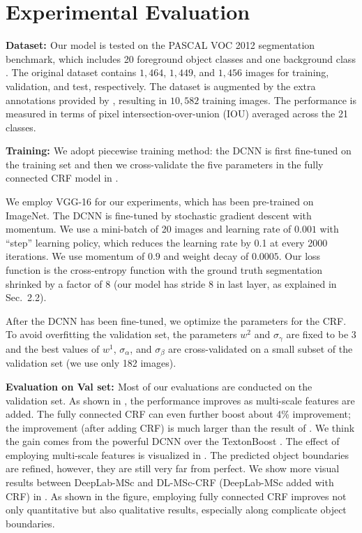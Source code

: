 \section{Experimental Evaluation}
\label{sec:experiments}

{\bf{Dataset: }} Our model is tested on the PASCAL VOC 2012 segmentation benchmark, which includes 20 foreground object classes and one background class \citep{everingham2014pascal}. The original dataset contains $1,464$, $1,449$, and $1,456$ images for training, validation, and test, respectively. The dataset is augmented by the extra annotations provided by \citep{hariharan2011semantic}, resulting in $10,582$ training images. The performance is measured in terms of pixel intersection-over-union (IOU) averaged across the 21 classes. 

{\bf{Training: }} We adopt piecewise training method: the DCNN is first fine-tuned on the training set and then we cross-validate the five parameters in the fully connected CRF model in . 


  We employ VGG-16 for our experiments, which has been pre-trained on ImageNet. The DCNN is fine-tuned by stochastic gradient descent with momentum. We use a mini-batch of 20 images and learning rate of $0.001$ with ``step'' learning policy, which reduces the learning rate by 0.1 at every 2000 iterations. We use momentum of $0.9$ and weight decay of $0.0005$. Our loss function is the cross-entropy function with the ground truth segmentation shrinked by a factor of 8 (our model has stride 8 in last layer, as explained in Sec.~2.2).


  After the DCNN has been fine-tuned, we optimize the parameters for the CRF. To avoid overfitting the validation set, the parameters $w^2$ and $\sigma_\gamma$ are fixed to be $3$ and the best values of $w^1$, $\sigma_\alpha$, and $\sigma_\beta$ are cross-validated on a small subset of the validation set (we use only 182 images).  

{\bf{Evaluation on Val set: }} Most of our evaluations are conducted on the validation set. As shown in , the performance improves as multi-scale features are added. The fully connected CRF can even further boost about 4\% improvement; the improvement (after adding CRF) is much larger than the result of \citet{krahenbuhl2011efficient}. We think the gain comes from the powerful DCNN over the TextonBoost \citep{shotton2009textonboost}. The effect of employing multi-scale features is visualized in . The predicted object boundaries are refined, however, they are still very far from perfect. We show more visual results between DeepLab-MSc and DL-MSc-CRF (DeepLab-MSc added with CRF) in . As shown in the figure, employing fully connected CRF improves not only quantitative but also qualitative results, especially along complicate object boundaries.

